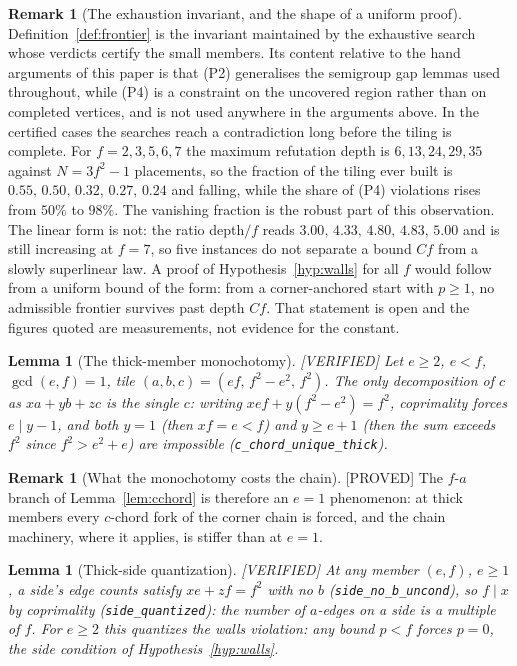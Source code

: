 \documentclass[11pt,reqno]{amsart}
\theoremstyle{plain}
\newtheorem{lemma}[theorem]{Lemma}
\theoremstyle{definition}
\newtheorem{remark}[theorem]{Remark}
\newcommand{\lab}[1]{\hfill\textnormal{\footnotesize\textsc{[#1]}}}
\begin{document}
\begin{remark}[The exhaustion invariant, and the shape of a uniform proof]\label{rem:enginelaw}
Definition~\ref{def:frontier} is the invariant maintained by the exhaustive search whose verdicts
certify the small members. Its content relative to the hand arguments of this paper is that (P2)
generalises the semigroup gap lemmas used throughout, while (P4) is a constraint on the uncovered
region rather than on completed vertices, and is not used anywhere in the arguments above. In the
certified cases the searches reach a contradiction long before the tiling is complete. For
$f=2,3,5,6,7$ the maximum refutation depth is $6,13,24,29,35$ against $N=3f^2-1$ placements, so
the fraction of the tiling ever built is $0.55,\,0.50,\,0.32,\,0.27,\,0.24$ and falling, while the
share of (P4) violations rises from $50\%$ to $98\%$. The vanishing fraction is the robust part of
this observation. The linear form is not: the ratio depth$/f$ reads $3.00,\,4.33,\,4.80,\,4.83,\,
5.00$ and is still increasing at $f=7$, so five instances do not separate a bound $Cf$ from a
slowly superlinear law. A proof of Hypothesis~\ref{hyp:walls} for all $f$ would follow from a
uniform bound of the form: from a corner-anchored start with $p\ge1$, no admissible frontier
survives past depth $Cf$. That statement is open and the figures quoted are measurements, not
evidence for the constant.
\end{remark}

\begin{lemma}[The thick-member monochotomy]\label{lem:monochotomy}\lab{VERIFIED}
Let $e\ge2$, $e<f$, $\gcd(e,f)=1$, tile $(a,b,c)=(ef,\,f^2-e^2,\,f^2)$. The only decomposition of
$c$ as $xa+yb+zc$ is the single $c$: writing $xef+y(f^2-e^2)=f^2$, coprimality forces
$e\mid y-1$, and both $y=1$ (then $xf=e<f$) and $y\ge e+1$ (then the sum exceeds $f^2$ since
$f^2>e^2+e$) are impossible (\texttt{c\_chord\_unique\_thick}).
\end{lemma}

\begin{remark}[What the monochotomy costs the chain]\label{rem:monochain}\lab{PROVED}
The $f$-$a$ branch of Lemma~\ref{lem:cchord} is therefore an $e=1$ phenomenon: at thick members
every $c$-chord fork of the corner chain is forced, and the chain machinery, where it applies, is
stiffer than at $e=1$.
\end{remark}

\begin{lemma}[Thick-side quantization]\label{lem:sidequant}\lab{VERIFIED}
At any member $(e,f)$, $e\ge1$, a side's edge counts satisfy $xe+zf=f^2$ with no $b$
(\texttt{side\_no\_b\_uncond}), so $f\mid x$ by coprimality (\texttt{side\_quantized}): the number
of $a$-edges on a side is a multiple of $f$. For $e\ge2$ this quantizes the walls violation: any
bound $p<f$ forces $p=0$, the side condition of Hypothesis~\ref{hyp:walls}.
\end{lemma}
\end{document}
